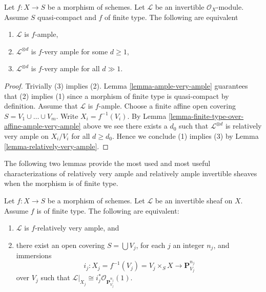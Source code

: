 \begin{lemma}
\label{lemma-finite-type-ample-very-ample}
Let $f : X \to S$ be a morphism of schemes.
Let $\mathcal{L}$ be an invertible $\mathcal{O}_X$-module.
Assume $S$ quasi-compact and $f$ of finite type.
The following are equivalent
\begin{enumerate}
\item $\mathcal{L}$ is $f$-ample,
\item $\mathcal{L}^{\otimes d}$ is $f$-very ample for some $d \geq 1$,
\item $\mathcal{L}^{\otimes d}$ is $f$-very ample for all $d \gg 1$.
\end{enumerate}
\end{lemma}

\begin{proof}
Trivially (3) implies (2). Lemma \ref{lemma-ample-very-ample} guarantees that
(2) implies (1) since a morphism of finite type is quasi-compact
by definition. Assume that $\mathcal{L}$ is $f$-ample. Choose a finite affine
open covering $S = V_1 \cup \ldots \cup V_m$. Write $X_i = f^{-1}(V_i)$.
By Lemma \ref{lemma-finite-type-over-affine-ample-very-ample} above we see
there exists a $d_0$ such that $\mathcal{L}^{\otimes d}$ is
relatively very ample on $X_i/V_i$ for all $d \geq d_0$. Hence we conclude
(1) implies (3) by Lemma \ref{lemma-relatively-very-ample}.
\end{proof}

\noindent
The following two lemmas provide the most used and most useful
characterizations of relatively very ample and relatively ample
invertible sheaves when the morphism is of finite type.

\begin{lemma}
\label{lemma-characterize-very-ample-on-finite-type}
Let $f : X \to S$ be a morphism of schemes.
Let $\mathcal{L}$ be an invertible sheaf on $X$.
Assume $f$ is of finite type.
The following are equivalent:
\begin{enumerate}
\item $\mathcal{L}$ is $f$-relatively very ample, and
\item there exist an open covering $S = \bigcup V_j$,
for each $j$ an integer $n_j$, and immersions
$$
i_j :
X_j = f^{-1}(V_j) = V_j \times_S X
\longrightarrow
\mathbf{P}^{n_j}_{V_j}
$$
over $V_j$ such that
$\mathcal{L}|_{X_j} \cong i_j^*\mathcal{O}_{\mathbf{P}^{n_j}_{V_j}}(1)$.
\end{enumerate}
\end{lemma}


